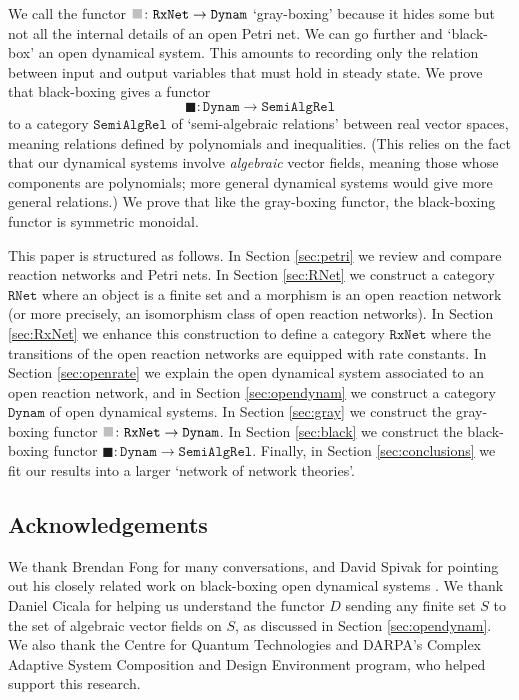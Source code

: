 \documentclass{compositionalityarticle}
\newcommand{\RNet}{\mathtt{RNet}}
\newcommand{\RxNet}{\mathtt{RxNet}}
\newcommand{\Dynam}{\mathtt{Dynam}}
\newcommand{\SemiAlgRel}{\mathtt{SemiAlgRel}}
\newcommand*{\graysquare}{\textcolor{lightgray}{\blacksquare}}
\newcommand{\maps}{\colon}
\theoremstyle{compositionality}
\theoremstyle{remark}
\begin{document}
We call the functor $\graysquare \maps \RxNet \to \Dynam$ `gray-boxing' because it hides some but not all the internal details of an open Petri net.  We can go further and `black-box' an open dynamical system.  This amounts to recording only the relation between input and output variables that must hold in steady state.  We prove that black-boxing gives a functor 
\[        \blacksquare \maps \Dynam \to \SemiAlgRel \] 
to a category $\SemiAlgRel$ of `semi-algebraic relations' between real vector spaces, meaning relations defined by polynomials and inequalities.  (This relies on the fact that our dynamical systems involve \emph{algebraic} vector fields, meaning those whose components are polynomials; more general dynamical systems would give more general relations.)  We prove that like the gray-boxing functor, the black-boxing functor is symmetric monoidal.  

This paper is structured as follows. In Section \ref{sec:petri} we review and compare reaction networks and Petri nets.  In Section \ref{sec:RNet} we construct a category $\RNet$ where an object is a finite set and a morphism is an open reaction network (or more precisely, an isomorphism class of open reaction networks).   In Section \ref{sec:RxNet} we enhance this construction to define a category $\RxNet$ where the transitions of the open reaction networks are equipped with rate constants.   In Section \ref{sec:openrate} we explain the open dynamical system associated to an open reaction network, and in Section \ref{sec:opendynam} we construct a category $\Dynam$ of open dynamical systems. In Section \ref{sec:gray} we construct the gray-boxing functor $\graysquare \maps \RxNet \to \Dynam$.   In Section \ref{sec:black} we construct the black-boxing functor $\blacksquare \maps \Dynam \to \SemiAlgRel$.  Finally, in Section \ref{sec:conclusions} we fit our results into a larger `network of network theories'.

\subsection*{Acknowledgements}

We thank Brendan Fong for many conversations, and David Spivak for pointing out his closely related work on black-boxing open dynamical systems \cite{Spivak}. We thank Daniel Cicala for helping us understand the functor $D$ sending any finite set $S$ to the set of algebraic vector fields on $S$, as discussed in Section \ref{sec:opendynam}.  We also thank the Centre for Quantum Technologies and DARPA's Complex Adaptive System Composition and Design Environment program, who helped support this research.
\end{document}
